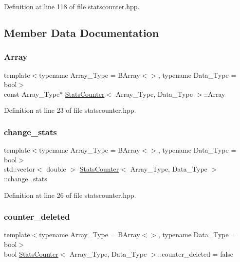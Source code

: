 Definition at line 118 of file statscounter.\+hpp.



\subsection{Member Data Documentation}
\mbox{\label{class_stats_counter_aa826cd748cd3b1a57cbec52424285485}} 
\subsubsection{\texorpdfstring{Array}{Array}}
{\footnotesize\ttfamily template$<$typename Array\+\_\+\+Type = B\+Array$<$$>$, typename Data\+\_\+\+Type = bool$>$ \\
const Array\+\_\+\+Type$\ast$ \hyperlink{class_stats_counter}{Stats\+Counter}$<$ Array\+\_\+\+Type, Data\+\_\+\+Type $>$\+::Array}



Definition at line 23 of file statscounter.\+hpp.

\mbox{\label{class_stats_counter_a42c926799d8cb0abc6f5a1cfbc073f69}} 
\subsubsection{\texorpdfstring{change\+\_\+stats}{change\_stats}}
{\footnotesize\ttfamily template$<$typename Array\+\_\+\+Type = B\+Array$<$$>$, typename Data\+\_\+\+Type = bool$>$ \\
std\+::vector$<$ double $>$ \hyperlink{class_stats_counter}{Stats\+Counter}$<$ Array\+\_\+\+Type, Data\+\_\+\+Type $>$\+::change\+\_\+stats}



Definition at line 26 of file statscounter.\+hpp.

\mbox{\label{class_stats_counter_a9306fc44d8b02a953da4237f8950a53a}} 
\subsubsection{\texorpdfstring{counter\+\_\+deleted}{counter\_deleted}}
{\footnotesize\ttfamily template$<$typename Array\+\_\+\+Type = B\+Array$<$$>$, typename Data\+\_\+\+Type = bool$>$ \\
bool \hyperlink{class_stats_counter}{Stats\+Counter}$<$ Array\+\_\+\+Type, Data\+\_\+\+Type $>$\+::counter\+\_\+deleted = false}



